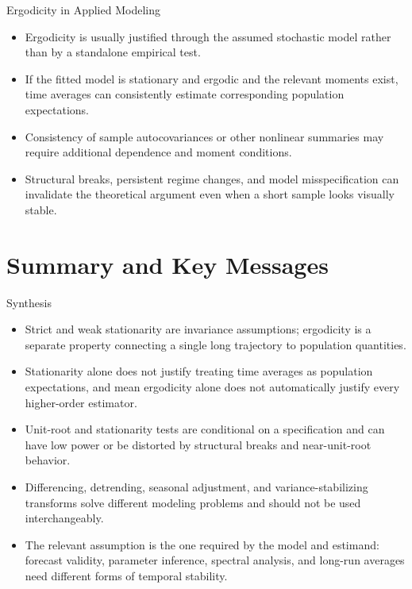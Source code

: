 \documentclass{beamer}
\begin{document}
\begin{frame}{Ergodicity in Applied Modeling}
  \begin{itemize}
    \item Ergodicity is usually justified through the assumed stochastic model rather than by a standalone empirical test.
    \item If the fitted model is stationary and ergodic and the relevant moments exist, time averages can consistently estimate corresponding population expectations.
    \item Consistency of sample autocovariances or other nonlinear summaries may require additional dependence and moment conditions.
    \item Structural breaks, persistent regime changes, and model misspecification can invalidate the theoretical argument even when a short sample looks visually stable.
  \end{itemize}
\end{frame}

\section{Summary and Key Messages}

\begin{frame}{Synthesis}
  \begin{itemize}
    \item Strict and weak stationarity are invariance assumptions; ergodicity is a separate property connecting a single long trajectory to population quantities.
    \item Stationarity alone does not justify treating time averages as population expectations, and mean ergodicity alone does not automatically justify every higher-order estimator.
    \item Unit-root and stationarity tests are conditional on a specification and can have low power or be distorted by structural breaks and near-unit-root behavior.
    \item Differencing, detrending, seasonal adjustment, and variance-stabilizing transforms solve different modeling problems and should not be used interchangeably.
    \item The relevant assumption is the one required by the model and estimand: forecast validity, parameter inference, spectral analysis, and long-run averages need different forms of temporal stability.
  \end{itemize}
\end{frame}
\end{document}
